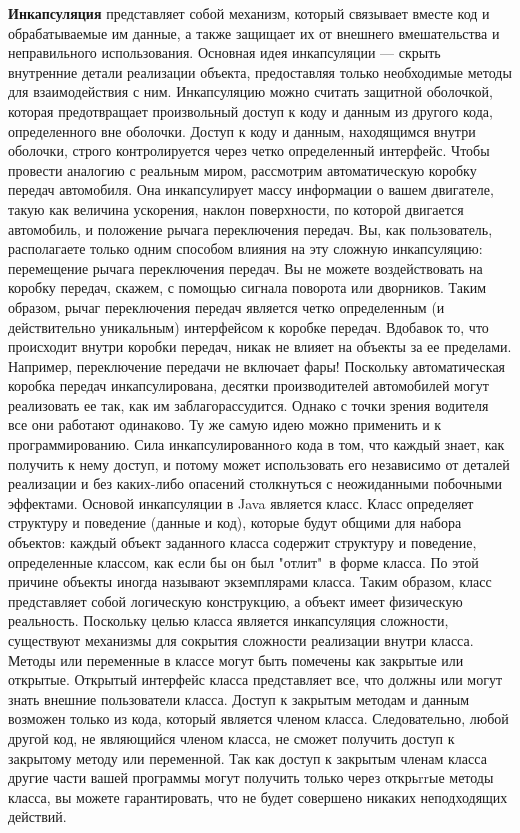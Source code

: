 \textbf{Инкапсуляция} представляет собой механизм, который связывает вместе код и обрабатываемые им данные, а также защищает их от внешнего вмешательства и неправильного использования. Основная идея инкапсуляции — скрыть внутренние детали реализации объекта, предоставляя только необходимые методы для взаимодействия с ним. Инкапсуляцию можно считать защитной оболочкой, которая предотвращает произвольный доступ к коду и данным из другого кода, определенного вне оболочки. Доступ к коду и данным, находящимся внутри оболочки, строго контролируется через четко определенный интерфейс. Чтобы провести аналогию с реальным миром, рассмотрим автоматическую коробку передач автомобиля. Она инкапсулирует массу информации о вашем двигателе, такую как величина ускорения, наклон поверхности, по которой двигается автомобиль, и положение рычага переключения передач. Вы, как пользователь, располагаете только одним способом влияния на эту сложную инкапсуляцию: перемещение рычага переключения передач. Вы не можете воздействовать на коробку передач, скажем, с помощью сигнала поворота или дворников. Таким образом, рычаг переключения передач является четко определенным (и действительно уникальным) интерфейсом к коробке передач. Вдобавок то, что происходит внутри коробки передач, никак не влияет на объекты за ее пределами. Например, переключение передачи не включает фары! Поскольку автоматическая коробка передач инкапсулирована, десятки производителей автомобилей могут реализовать ее так, как им заблагорассудится. Однако с точки зрения водителя все они работают одинаково. Ту же самую идею можно применить и к программированию. Сила инкапсулированноrо кода в том, что каждый знает, как получить к нему доступ, и потому может использовать его независимо от деталей реализации и без каких-либо опасений столкнуться с неожиданными побочными эффектами. Основой инкапсуляции в Java является класс. Класс определяет структуру и поведение (данные и код), которые будут общими для набора объектов: каждый объект заданного класса содержит структуру и поведение, определенные классом, как если бы он был "отлит"\, в форме класса. По этой причине объекты иногда называют экземплярами класса. Таким образом, класс представляет собой логическую конструкцию, а объект имеет физическую реальность. Поскольку целью класса является инкапсуляция сложности, существуют механизмы для сокрытия сложности реализации внутри класса. Методы или переменные в классе могут быть помечены как закрытые или открытые. Открытый интерфейс класса представляет все, что должны или могут знать внешние пользователи класса. Доступ к закрытым методам и данным возможен только из кода, который является членом класса. Следовательно, любой другой код, не являющийся членом класса, не сможет получить доступ к закрытому методу или переменной. Так как доступ к закрытым членам класса другие части вашей программы могут получить только через открьrrые методы класса, вы можете гарантировать, что не будет совершено никаких неподходящих действий. \\
